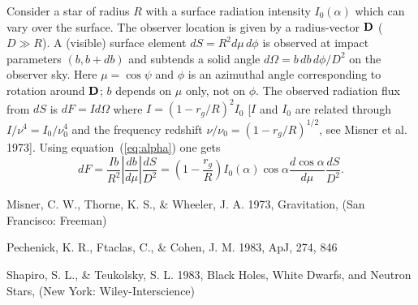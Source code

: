 \documentclass{article}
\def\dd{{ d}}
\begin{document}
Consider a star of radius $R$ with a surface radiation intensity 
$I_0(\alpha)$ which can vary over the surface. The observer location is 
given by a radius-vector ${\bf D}$ ($D\gg R$). A (visible) surface element 
$\dd S=R^2\dd\mu\,\dd\phi$ is observed at impact parameters $(b,b+\dd b)$ and 
subtends a solid angle $\dd\Omega=b\,\dd b\,\dd\phi/D^2$ on the observer sky.
Here $\mu=\cos\psi$ and $\phi$ is an azimuthal angle corresponding to 
rotation around ${\bf D}$; $b$ depends on $\mu$ only, not on $\phi$. 
The observed radiation flux from $\dd S$ is $\dd F=I\dd\Omega$ where 
$I=(1-r_g/R)^2I_0$ [$I$ and $I_0$ are related through $I/\nu^4=I_0/\nu_0^4$
and the frequency redshift $\nu/\nu_0=(1-r_g/R)^{1/2}$, see 
Misner et al. 1973]. Using equation~(\ref{eq:alpha}) one gets
\begin{equation}
\label{eq:flux}
   \dd F=\frac{Ib}{R^2}|\frac{\dd b}{\dd\mu}|\frac{\dd S}{D^2} 
   =\left(1-\frac{r_g}{R}\right)I_0(\alpha)\cos\alpha
     \frac{\dd\cos\alpha}{\dd\mu}\frac{\dd S}{D^2}.
\end{equation}




\begin{references}

Misner, C. W., Thorne, K. S., \& Wheeler, J. A. 1973, Gravitation,
(San Francisco: Freeman)

Pechenick, K. R., Ftaclas, C., \& Cohen, J. M. 1983, ApJ, 274, 846

Shapiro, S. L., \& Teukolsky, S. L. 1983, Black Holes, White Dwarfs,
and Neutron Stars, (New York: Wiley-Interscience)


\end{references}

\end{document}
